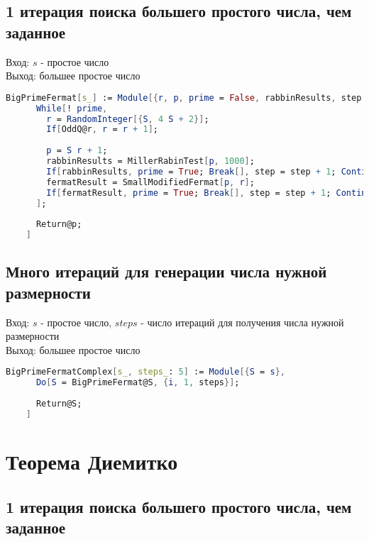     \subsection{1 итерация поиска большего простого числа, чем заданное}

      Вход: {$s$} - простое число \\
      Выход: большее простое число

      \begin{lstlisting}[language=Mathematica,caption={
	Генерация с использованием малой модифицированной теоремы Ферма (1 итерация)
      }]
	BigPrimeFermat[s_] := Module[{r, p, prime = False, rabbinResults, step = 0, fermatResult, S = s},
	  While[! prime,
	    r = RandomInteger[{S, 4 S + 2}];
	    If[OddQ@r, r = r + 1];
	  
	    p = S r + 1;
	    rabbinResults = MillerRabinTest[p, 1000];
	    If[rabbinResults, prime = True; Break[], step = step + 1; Continue[]];
	    fermatResult = SmallModifiedFermat[p, r];
	    If[fermatResult, prime = True; Break[], step = step + 1; Continue[]];
	  ];
	  
	  Return@p;
	]
      \end{lstlisting}

    \subsection{Много итераций для генерации числа нужной размерности}
    
      Вход: {$s$} - простое число, {$steps$} - число итераций для получения числа нужной размерности \\
      Выход: большее простое число
  
      \begin{lstlisting}[language=Mathematica,caption={
	Генерация с использованием малой модифицированной теоремы Ферма (много итераций)
      }]
	BigPrimeFermatComplex[s_, steps_: 5] := Module[{S = s},
	  Do[S = BigPrimeFermat@S, {i, 1, steps}];
  
	  Return@S;
	]
      \end{lstlisting}

  \section{Теорема Диемитко}

    \subsection{1 итерация поиска большего простого числа, чем заданное}

